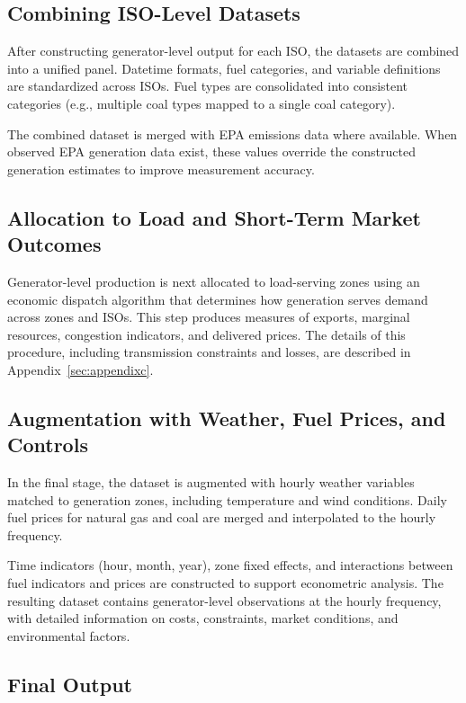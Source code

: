 \documentclass[12pt]{article}
\begin{document}
\subsection{Combining ISO-Level Datasets}

After constructing generator-level output for each ISO, the datasets are combined into a unified panel. Datetime formats, fuel categories, and variable definitions are standardized across ISOs. Fuel types are consolidated into consistent categories (e.g., multiple coal types mapped to a single coal category).

The combined dataset is merged with EPA emissions data where available. When observed EPA generation data exist, these values override the constructed generation estimates to improve measurement accuracy.

\subsection{Allocation to Load and Short-Term Market Outcomes}

Generator-level production is next allocated to load-serving zones using an economic dispatch algorithm that determines how generation serves demand across zones and ISOs. This step produces measures of exports, marginal resources, congestion indicators, and delivered prices. The details of this procedure, including transmission constraints and losses, are described in Appendix~\ref{sec:appendixc}.

\subsection{Augmentation with Weather, Fuel Prices, and Controls}

In the final stage, the dataset is augmented with hourly weather variables matched to generation zones, including temperature and wind conditions. Daily fuel prices for natural gas and coal are merged and interpolated to the hourly frequency.

Time indicators (hour, month, year), zone fixed effects, and interactions between fuel indicators and prices are constructed to support econometric analysis. The resulting dataset contains generator-level observations at the hourly frequency, with detailed information on costs, constraints, market conditions, and environmental factors.

\subsection{Final Output}
\end{document}
